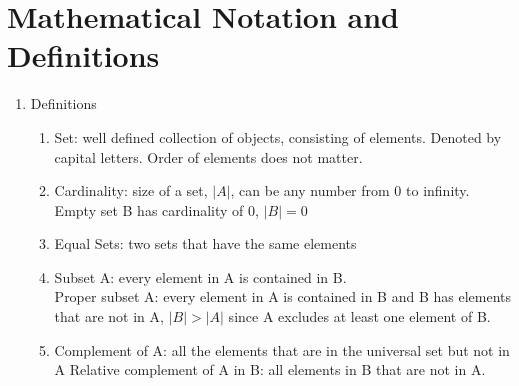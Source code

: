 \documentclass[11pt]{article}
\begin{document}
\section*{Mathematical Notation and Definitions}
\begin{enumerate}
\item Definitions
\begin{enumerate}

\item
Set: well defined collection of objects, consisting of elements. Denoted by capital letters. Order of elements does not matter. 
\item
Cardinality: size of a set, $|A|$, can be any number from 0 to infinity. Empty set B has cardinality of 0, $|B| = 0$
\item
Equal Sets: two sets that have the same elements
\item 
Subset A: every element in A is contained in B.  \\
Proper subset A: every element in A is contained in B and B has elements that are not in A, $ |B| > |A|$ since A excludes at least one element of B.
\item 
Complement of A: all the elements that are in the universal set but not in A
Relative complement of A in B: all elements in B that are not in A.
\end{enumerate}



\end{enumerate}
\end{document}
